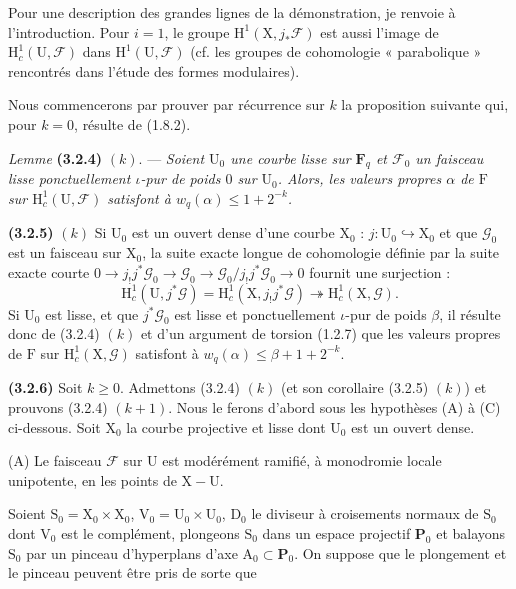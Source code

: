 \documentclass[11pt,leqno]{article}
\begin{document}
Pour une description des grandes lignes de la démonstration, je renvoie à l’introduction. Pour \(i=1\), le groupe \(\mathrm{H}^1(\mathrm{X},j_*\mathscr{F})\) est aussi l’image de \(\mathrm{H}_c^1(\mathrm{U},\mathscr{F})\) dans \(\mathrm{H}^1(\mathrm{U},\mathscr{F})\) (cf. les groupes de cohomologie « parabolique » rencontrés dans l’étude des formes modulaires).

Nous commencerons par prouver par récurrence sur \(k\) la proposition suivante qui, pour \(k=0\), résulte de (1.8.2).

\textit{Lemme} \textbf{(3.2.4)} \((k)\). — \textit{Soient \(\mathrm{U}_0\) une courbe lisse sur \(\mathbf{F}_q\) et \(\mathscr{F}_0\) un faisceau lisse ponctuellement \(\iota\)-pur de poids \(0\) sur \(\mathrm{U}_0\). Alors, les valeurs propres \(\alpha\) de \(\mathrm{F}\) sur \(\mathrm{H}_c^1(\mathrm{U},\mathscr{F})\) satisfont à \(w_q(\alpha)\leq 1+2^{-k}\).}

\textbf{(3.2.5)} \((k)\) Si \(\mathrm{U}_0\) est un ouvert dense d’une courbe \(\mathrm{X}_0\) : \(j:\mathrm{U}_0\hookrightarrow\mathrm{X}_0\) et que \(\mathscr{G}_0\) est un faisceau sur \(\mathrm{X}_0\), la suite exacte longue de cohomologie définie par la suite exacte courte \(0\to j_!j^*\mathscr{G}_0\to\mathscr{G}_0\to\mathscr{G}_0/j_!j^*\mathscr{G}_0\to0\) fournit une surjection :
\[
\mathrm{H}_c^1(\mathrm{U},j^*\mathscr{G})
=\mathrm{H}_c^1(\mathrm{X},j_!j^*\mathscr{G})
\twoheadrightarrow\mathrm{H}_c^1(\mathrm{X},\mathscr{G}).
\]
Si \(\mathrm{U}_0\) est lisse, et que \(j^*\mathscr{G}_0\) est lisse et ponctuellement \(\iota\)-pur de poids \(\beta\), il résulte donc de (3.2.4) \((k)\) et d’un argument de torsion (1.2.7) que les valeurs propres de \(\mathrm{F}\) sur \(\mathrm{H}_c^1(\mathrm{X},\mathscr{G})\) satisfont à \(w_q(\alpha)\leq\beta+1+2^{-k}\).

\textbf{(3.2.6)} Soit \(k\geq0\). Admettons (3.2.4) \((k)\) (et son corollaire (3.2.5) \((k)\)) et prouvons (3.2.4) \((k+1)\). Nous le ferons d’abord sous les hypothèses (A) à (C) ci-dessous. Soit \(\mathrm{X}_0\) la courbe projective et lisse dont \(\mathrm{U}_0\) est un ouvert dense.

(A) Le faisceau \(\mathscr{F}\) sur \(\mathrm{U}\) est modérément ramifié, à monodromie locale unipotente, en les points de \(\mathrm{X}-\mathrm{U}\).

Soient \(\mathrm{S}_0=\mathrm{X}_0\times\mathrm{X}_0\), \(\mathrm{V}_0=\mathrm{U}_0\times\mathrm{U}_0\), \(\mathrm{D}_0\) le diviseur à croisements normaux de \(\mathrm{S}_0\) dont \(\mathrm{V}_0\) est le complément, plongeons \(\mathrm{S}_0\) dans un espace projectif \(\mathbf{P}_0\) et balayons \(\mathrm{S}_0\) par un pinceau d’hyperplans d’axe \(\mathrm{A}_0\subset\mathbf{P}_0\). On suppose que le plongement et le pinceau peuvent être pris de sorte que
\end{document}
